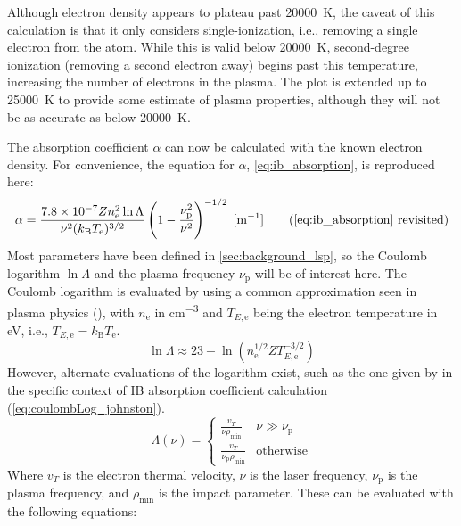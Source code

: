         Although electron density appears to plateau past \qty{20000}{K}, the caveat of this calculation is that it only considers single-ionization, i.e., removing a single electron from the atom. While this is valid below \qty{20000}{K}, second-degree ionization (removing a second electron away) begins past this temperature, increasing the number of electrons in the plasma. The plot is extended up to \qty{25000}{K} to provide some estimate of plasma properties, although they will not be as accurate as below \qty{20000}{K}.

        The absorption coefficient $\alpha$ can now be calculated with the known electron density. For convenience, the equation for $\alpha$, \autoref{eq:ib_absorption}, is reproduced here:
        \begin{equation*}
            \ibalphaeq \tag{\ref{eq:ib_absorption} revisited}
        \end{equation*}
        Most parameters have been defined in \autoref{sec:background_lsp}, so the Coulomb logarithm $\ln{\Lambda}$ and the plasma frequency $\nu_\mathrm{p}$ will be of interest here. The Coulomb logarithm is evaluated by \textcite{nassarInvestigationLasersustainedPlasma2012} using a common approximation seen in plasma physics (\textcite{richardson2019NRLPlasma2019}), with $n_\mathrm{e}$ in \unit{cm^{-3}} and $T_{E,\mathrm{e}}$ being the electron temperature in \unit{eV}, i.e., $T_{E,\mathrm{e}} = k_\mathrm{B}T_\mathrm{e}$.
        \begin{equation}\label{eq:coulombLog_NRL}
            \ln{\Lambda} \approx 23-\ln{(n_\mathrm{e}^{1/2}ZT_{E,\mathrm{e}}^{-3/2})}
        \end{equation}
        However, alternate evaluations of the logarithm exist, such as the one given by \textcite{johnstonCorrectValuesHighfrequency1973} in the specific context of IB absorption coefficient calculation (\autoref{eq:coulombLog_johnston}). 
        \begin{equation} \label{eq:coulombLog_johnston}
            \Lambda(\nu) = \begin{cases}
                \frac{v_T}{\nu\rho_\mathrm{min}} & \nu \gg \nu_\mathrm{p}\\
                \frac{v_T}{\nu_\mathrm{p}\rho_\mathrm{min}} & \text{otherwise}
            \end{cases}
        \end{equation}
        Where $v_T$ is the electron thermal velocity, $\nu$ is the laser frequency, $\nu_\mathrm{p}$ is the plasma frequency, and $\rho_\mathrm{min}$ is the impact parameter. These can be evaluated with the following equations:
